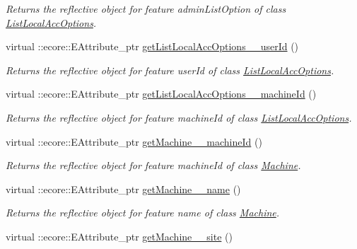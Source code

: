 \begin{DoxyCompactItemize}
\begin{DoxyCompactList}\small\item\em Returns the reflective object for feature adminListOption of class \hyperlink{classUMS__Data_1_1ListLocalAccOptions}{ListLocalAccOptions}. \item\end{DoxyCompactList}\item 
virtual ::ecore::EAttribute\_\-ptr \hyperlink{classUMS__Data_1_1UMS__DataPackage_aded36a5394212d61d5cb01c694ecf9b5}{getListLocalAccOptions\_\-\_\-userId} ()
\begin{DoxyCompactList}\small\item\em Returns the reflective object for feature userId of class \hyperlink{classUMS__Data_1_1ListLocalAccOptions}{ListLocalAccOptions}. \item\end{DoxyCompactList}\item 
virtual ::ecore::EAttribute\_\-ptr \hyperlink{classUMS__Data_1_1UMS__DataPackage_a1a37aa16f0ca283277a2370930acd54c}{getListLocalAccOptions\_\-\_\-machineId} ()
\begin{DoxyCompactList}\small\item\em Returns the reflective object for feature machineId of class \hyperlink{classUMS__Data_1_1ListLocalAccOptions}{ListLocalAccOptions}. \item\end{DoxyCompactList}\item 
virtual ::ecore::EAttribute\_\-ptr \hyperlink{classUMS__Data_1_1UMS__DataPackage_a97321e3c70d1e48ebd3eb0994cc7373c}{getMachine\_\-\_\-machineId} ()
\begin{DoxyCompactList}\small\item\em Returns the reflective object for feature machineId of class \hyperlink{classUMS__Data_1_1Machine}{Machine}. \item\end{DoxyCompactList}\item 
virtual ::ecore::EAttribute\_\-ptr \hyperlink{classUMS__Data_1_1UMS__DataPackage_af28b01a13518b2a4528c38864852cec3}{getMachine\_\-\_\-name} ()
\begin{DoxyCompactList}\small\item\em Returns the reflective object for feature name of class \hyperlink{classUMS__Data_1_1Machine}{Machine}. \item\end{DoxyCompactList}\item 
virtual ::ecore::EAttribute\_\-ptr \hyperlink{classUMS__Data_1_1UMS__DataPackage_a4e79cc1912982f0a6cdb4cd48a51ab10}{getMachine\_\-\_\-site} ()

\end{DoxyCompactItemize}

